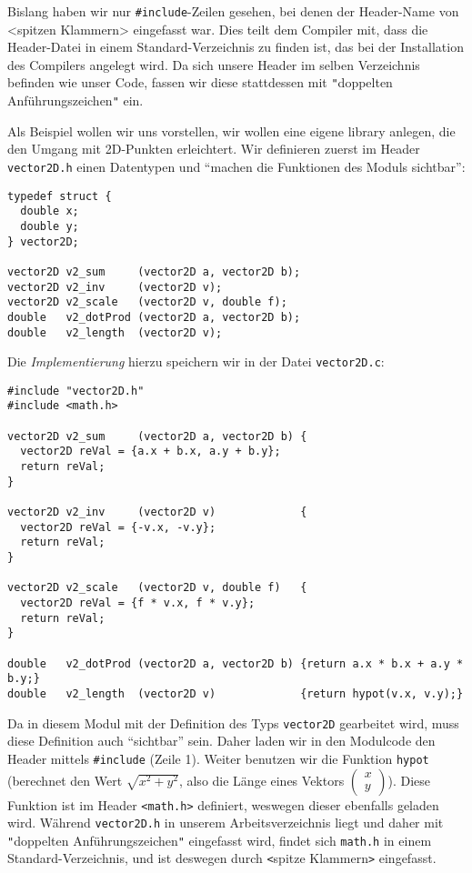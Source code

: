 Bislang haben wir nur \texttt{#include}-Zeilen gesehen, bei denen der Header-Name von <spitzen Klammern> eingefasst war. Dies teilt dem Compiler mit, dass die Header-Datei in einem Standard-Verzeichnis zu finden ist, das bei der Installation des Compilers angelegt wird. Da sich unsere Header \idR im selben Verzeichnis befinden wie unser Code, fassen wir diese stattdessen mit \texttt{"}doppelten Anführungszeichen\texttt{"} ein.

Als Beispiel wollen wir uns vorstellen, wir wollen eine eigene library anlegen, die den Umgang mit 2D-Punkten erleichtert. Wir definieren zuerst im Header \texttt{vector2D.h} einen Datentypen und \enquote{machen die Funktionen des Moduls sichtbar}:

\begin{codebox}
\begin{verbatim}
typedef struct {
  double x;
  double y;
} vector2D;

vector2D v2_sum     (vector2D a, vector2D b);
vector2D v2_inv     (vector2D v);
vector2D v2_scale   (vector2D v, double f);
double   v2_dotProd (vector2D a, vector2D b);
double   v2_length  (vector2D v);
\end{verbatim}
\end{codebox}

Die \emph{Implementierung} hierzu speichern wir in der Datei \texttt{vector2D.c}:

\begin{codebox}
\begin{verbatim}
#include "vector2D.h"
#include <math.h>

vector2D v2_sum     (vector2D a, vector2D b) {
  vector2D reVal = {a.x + b.x, a.y + b.y}; 
  return reVal;
}

vector2D v2_inv     (vector2D v)             {
  vector2D reVal = {-v.x, -v.y};
  return reVal;
}

vector2D v2_scale   (vector2D v, double f)   {
  vector2D reVal = {f * v.x, f * v.y};
  return reVal;
}

double   v2_dotProd (vector2D a, vector2D b) {return a.x * b.x + a.y * b.y;}
double   v2_length  (vector2D v)             {return hypot(v.x, v.y);}
\end{verbatim}
\end{codebox}

Da in diesem Modul mit der Definition des Typs \texttt{vector2D} gearbeitet wird, muss diese Definition auch \enquote{sichtbar} sein. Daher laden wir in den Modulcode den Header mittels \texttt{#include} (Zeile 1). Weiter benutzen wir die Funktion \texttt{hypot} (berechnet den Wert $\sqrt{x^{2} + y^{2}}$, also die Länge eines Vektors $\begin{pmatrix}
x \\ y
\end{pmatrix}$). Diese Funktion ist im Header \texttt{<math.h>} definiert, weswegen dieser ebenfalls geladen wird. Während \texttt{vector2D.h} in unserem Arbeitsverzeichnis liegt und daher mit \texttt{"}doppelten Anführungszeichen\texttt{"} eingefasst wird, findet sich \texttt{math.h} in einem Standard-Verzeichnis, und ist deswegen durch \texttt{<}spitze Klammern\texttt{>} eingefasst.

